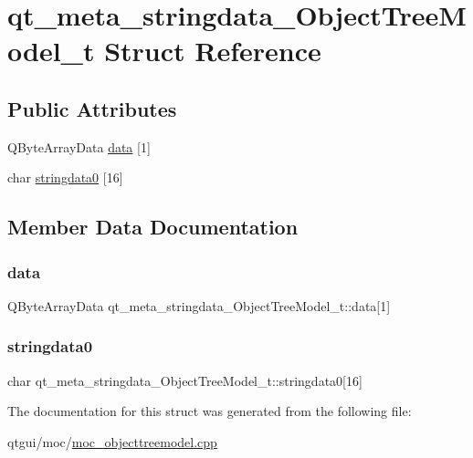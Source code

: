 \hypertarget{structqt__meta__stringdata___object_tree_model__t}{}\section{qt\+\_\+meta\+\_\+stringdata\+\_\+\+Object\+Tree\+Model\+\_\+t Struct Reference}
\label{structqt__meta__stringdata___object_tree_model__t}
\subsection*{Public Attributes}
\begin{DoxyCompactItemize}
\item 
Q\+Byte\+Array\+Data \mbox{\hyperlink{structqt__meta__stringdata___object_tree_model__t_ab476ed83867cac7625a39f0f5406f30e}{data}} \mbox{[}1\mbox{]}
\item 
char \mbox{\hyperlink{structqt__meta__stringdata___object_tree_model__t_a2a03e13225cc0d57c9be25a387be622a}{stringdata0}} \mbox{[}16\mbox{]}
\end{DoxyCompactItemize}


\subsection{Member Data Documentation}
\mbox{\label{structqt__meta__stringdata___object_tree_model__t_ab476ed83867cac7625a39f0f5406f30e}} 
\subsubsection{\texorpdfstring{data}{data}}
{\footnotesize\ttfamily Q\+Byte\+Array\+Data qt\+\_\+meta\+\_\+stringdata\+\_\+\+Object\+Tree\+Model\+\_\+t\+::data\mbox{[}1\mbox{]}}

\mbox{\label{structqt__meta__stringdata___object_tree_model__t_a2a03e13225cc0d57c9be25a387be622a}} 
\subsubsection{\texorpdfstring{stringdata0}{stringdata0}}
{\footnotesize\ttfamily char qt\+\_\+meta\+\_\+stringdata\+\_\+\+Object\+Tree\+Model\+\_\+t\+::stringdata0\mbox{[}16\mbox{]}}



The documentation for this struct was generated from the following file\+:\begin{DoxyCompactItemize}
\item 
qtgui/moc/\mbox{\hyperlink{moc__objecttreemodel_8cpp}{moc\+\_\+objecttreemodel.\+cpp}}\end{DoxyCompactItemize}

